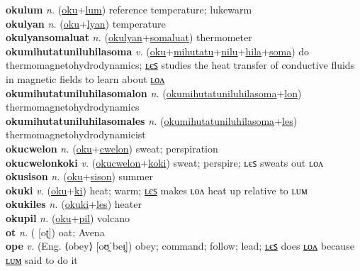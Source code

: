 \textbf{okulum} \textit{n.} (\hyperref[oku]{oku}+\hyperref[lum]{lum})
reference temperature; lukewarm \label{okulum} \\
\textbf{okulyan} \textit{n.} (\hyperref[oku]{oku}+\hyperref[lyan]{lyan})
temperature \label{okulyan} \\
\textbf{okulyansomaluat} \textit{n.} (\hyperref[okulyan]{okulyan}+\hyperref[somaluat]{somaluat})
thermometer \label{okulyansomaluat} \\
\textbf{okumihutatuniluhilasoma} \textit{v.} (\hyperref[oku]{oku}+\hyperref[mihutatu]{mihutatu}+\hyperref[nilu]{nilu}+\hyperref[hila]{hila}+\hyperref[soma]{soma})
do thermomagnetohydrodynamics; \hyperref[okumihutatuniluhilasomales]{ʟєꜱ} studies the heat transfer of conductive fluids in magnetic fields to learn about \hyperref[okumihutatuniluhilasomalon]{ʟᴏᴧ} \label{okumihutatuniluhilasoma} \\
\textbf{okumihutatuniluhilasomalon} \textit{n.} (\hyperref[okumihutatuniluhilasoma]{okumihutatuniluhilasoma}+\hyperref[lon]{lon})
thermomagnetohydrodynamics \label{okumihutatuniluhilasomalon} \\
\textbf{okumihutatuniluhilasomales} \textit{n.} (\hyperref[okumihutatuniluhilasoma]{okumihutatuniluhilasoma}+\hyperref[les]{les})
thermomagnetohydrodynamicist \label{okumihutatuniluhilasomales} \\
\textbf{okucwelon} \textit{n.} (\hyperref[oku]{oku}+\hyperref[cwelon]{cwelon})
sweat; perspiration \label{okucwelon} \\
\textbf{okucwelonkoki} \textit{v.} (\hyperref[okucwelon]{okucwelon}+\hyperref[koki]{koki})
sweat; perspire; ʟєꜱ sweats out ʟᴏᴧ \label{okucwelonkoki} \\
\textbf{okusison} \textit{n.} (\hyperref[oku]{oku}+\hyperref[sison]{sison})
summer \label{okusison} \\
\textbf{okuki} \textit{v.} (\hyperref[oku]{oku}+\hyperref[ki]{ki})
heat; warm; \hyperref[okukiles]{ʟєꜱ} makes ʟᴏᴧ heat up relative to ʟᴜᴍ \label{okuki} \\
\textbf{okukiles} \textit{n.} (\hyperref[okuki]{okuki}+\hyperref[les]{les})
heater \label{okukiles} \\
\textbf{okupil} \textit{n.} (\hyperref[oku]{oku}+\hyperref[pil]{pil})
volcano \label{okupil} \\
\textbf{ot} \textit{n.} ( [oʈ])
oat; Avena \label{ot} \\
\textbf{ope} \textit{v.} (Eng. ⟨obey⟩ [oʊ̯ˈbeɪ̯])
obey; command; follow; lead; \hyperref[opeles]{ʟєꜱ} does \hyperref[opelon]{ʟᴏᴧ} because \hyperref[opelum]{ʟᴜᴍ} said to do it \label{ope} \\
